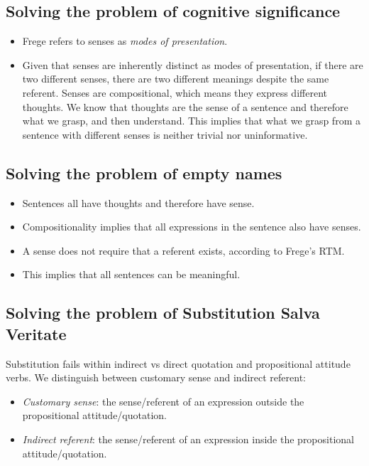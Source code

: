 \subsection{Solving the problem of cognitive significance}

\begin{itemize}
  \item Frege refers to senses as \emph{modes of presentation}.
  \item Given that senses are inherently distinct as modes of presentation, if there are two different senses, there are two different meanings despite the same referent. Senses are compositional, which means they express different thoughts. We know that thoughts are the sense of a sentence and therefore what we grasp, and then understand. This implies that what we grasp from a sentence with different senses is neither trivial nor uninformative.
\end{itemize}

\subsection{Solving the problem of empty names}

\begin{itemize}
  \item Sentences all have thoughts and therefore have sense.
  \item Compositionality implies that all expressions in the sentence also have senses.
  \item A sense does not require that a referent exists, according to Frege's RTM.
  \item This implies that all sentences can be meaningful.
\end{itemize}

\subsection{Solving the problem of Substitution Salva Veritate}

Substitution fails within indirect vs direct quotation and propositional attitude verbs. We distinguish between customary sense and indirect referent:

\begin{definition}\leavevmode
\begin{itemize}
  \item \emph{Customary sense}: the sense/\allowbreak referent of an expression outside the propositional attitude/\allowbreak quotation.
  \item \emph{Indirect referent}: the sense/\allowbreak referent of an expression inside the propositional attitude/\allowbreak quotation.
\end{itemize}
\end{definition}

